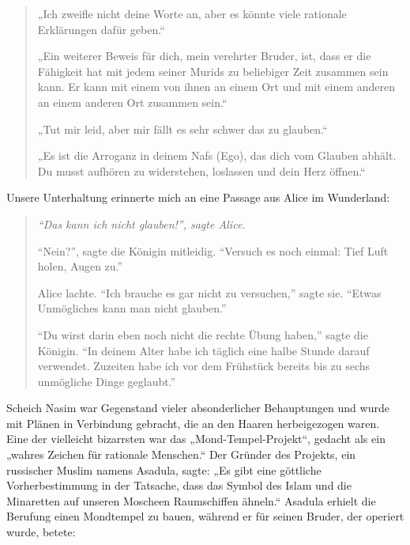 \documentclass[12pt]{memoir}
\begin{document}
\begin{quote}
„Ich zweifle nicht deine Worte an,
aber es könnte viele rationale Erklärungen dafür geben.“

„Ein weiterer Beweis für dich, mein verehrter Bruder, ist,
dass er die Fähigkeit hat mit jedem seiner Murids
zu beliebiger Zeit zusammen sein kann.
Er kann mit einem von ihnen an einem Ort und mit einem anderen
an einem anderen Ort zusammen sein.“

„Tut mir leid, aber mir fällt es sehr schwer das zu glauben.“

„Es ist die Arroganz in deinem Nafs (Ego), das dich vom Glauben abhält.
Du musst aufhören zu widerstehen, loslassen und dein Herz öffnen.“
\end{quote}

Unsere Unterhaltung erinnerte mich an eine Passage aus Alice im Wunderland:

\begin{quote}
\itshape
“Das kann ich nicht glauben!”, sagte Alice.

“Nein?”, sagte die Königin mitleidig.
“Versuch es noch einmal: Tief Luft holen, Augen zu.”

Alice lachte. “Ich brauche es gar nicht zu versuchen,” sagte sie.
“Etwas Unmögliches kann man nicht glauben.”

“Du wirst darin eben noch nicht die rechte Übung haben,” sagte die Königin.
“In deinem Alter habe ich täglich eine halbe Stunde darauf verwendet.
Zuzeiten habe ich vor dem Frühstück
bereits bis zu sechs unmögliche Dinge geglaubt.”
\end{quote}

Scheich Nasim war Gegenstand vieler absonderlicher Behauptungen
und wurde mit Plänen in Verbindung gebracht,
die an den Haaren herbeigezogen waren.
Eine der vielleicht bizarrsten war das „Mond-Tempel-Projekt“,
gedacht als ein „wahres Zeichen für rationale Menschen.“
Der Gründer des Projekts, ein russischer Muslim namens Asadula, sagte:
„Es gibt eine göttliche Vorherbestimmung in der Tatsache,
dass das Symbol des Islam und die Minaretten
auf unseren Moscheen Raumschiffen ähneln.“
Asadula erhielt die Berufung einen Mondtempel zu bauen,
während er für seinen Bruder, der operiert wurde, betete:
\end{document}
